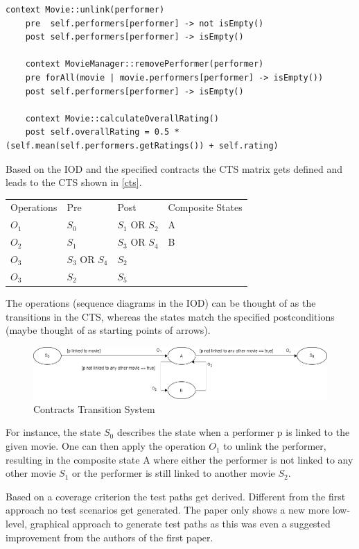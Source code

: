 \begin{lstlisting}[caption={Contracts written in OCL},label={contracts2}]
	context Movie::unlink(performer)
	pre  self.performers[performer] -> not isEmpty()
	post self.performers[performer] -> isEmpty()
	
	context MovieManager::removePerformer(performer)
	pre forAll(movie | movie.performers[performer] -> isEmpty())
	post self.performers[performer] -> isEmpty()
	
	context Movie::calculateOverallRating()
	post self.overallRating = 0.5 * (self.mean(self.performers.getRatings()) + self.rating)
\end{lstlisting}

Based on the IOD and the specified contracts the CTS matrix gets defined and leads to the CTS shown in \autoref{cts}.

\begin{longtable}[h]{llll}
	Operations & Pre & Post & Composite States \\
	$O_{1}$ & $S_{0}$ & $S_{1}$ OR $S_{2}$ & A \\
	$O_{2}$ & $S_{1}$ & $S_{3}$ OR $S_{4}$ & B \\
	$O_{3}$ & $S_{3}$ OR $S_{4}$ & $S_{2}$ & \\
	$O_{3}$ & $S_{2}$ & $S_{5}$ & \\
\end{longtable}
The operations (sequence diagrams in the IOD) can be thought of as the transitions in the CTS, whereas the states match the specified postconditions (maybe thought of as starting points of arrows).

\begin{figure}[h]
	\centering
	\includegraphics[width=\textwidth]{../images/topic3_cts.png}
	\caption{Contracts Transition System}
	\label{cts}
\end{figure}

For instance, the state $S_{0}$ describes the state when a performer p is linked to the given movie. One can then apply the operation $O_{1}$ to unlink the performer, resulting in the composite state A where either the performer is not linked to any other movie $S_{1}$ or the performer is still linked to another movie $S_{2}$.

Based on a coverage criterion the test paths get derived. Different from the first approach no test scenarios get generated. The paper only shows a new more low-level, graphical approach to generate test paths as this was even a suggested improvement from the authors of the first paper. 

